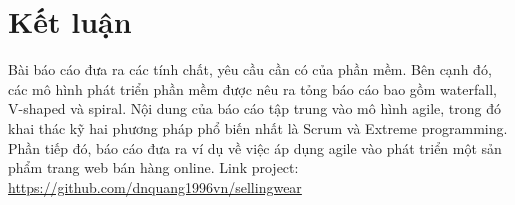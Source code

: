 \documentclass{article}
\begin{document}
\section{Kết luận}

Bài báo cáo đưa ra các tính chất, yêu cầu cần có của phần mềm. Bên cạnh đó, các mô hình phát triển phần mềm được nêu ra tỏng báo cáo bao gồm waterfall, V-shaped và spiral. Nội dung của báo cáo tập trung vào mô hình agile, trong đó khai thác kỹ hai phương pháp phổ biến nhất là Scrum và Extreme programming. Phần tiếp đó, báo cáo đưa ra ví dụ về việc áp dụng agile vào phát triển một sản phẩm trang web bán hàng online. 
Link project: \url{https://github.com/dnquang1996vn/sellingwear}



\printbibliography

\end{document}
